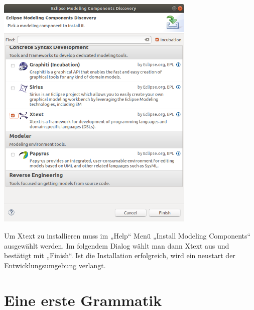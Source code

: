 \documentclass[a4]{article}
\begin{document}
\includegraphics[width=3.73660in,height=4.50470in]{./Pictures/1000020100000265000002E3C3D1AD84052DE450.png}

Um
Xtext zu installieren muss im „Help`` Menü „Install Modeling
Components`` ausgewählt werden. Im folgendem Dialog wählt man dann Xtext
aus und bestätigt mit „Finish``. Ist die Installation erfolgreich, wird
ein neustart der Entwicklungsumgebung verlangt.

\section[Eine erste
Grammatik]{\texorpdfstring{\protect\hypertarget{anchor-17}{}{}Eine erste
Grammatik}{Eine erste Grammatik}}\label{eine-erste-grammatik}
\end{document}

